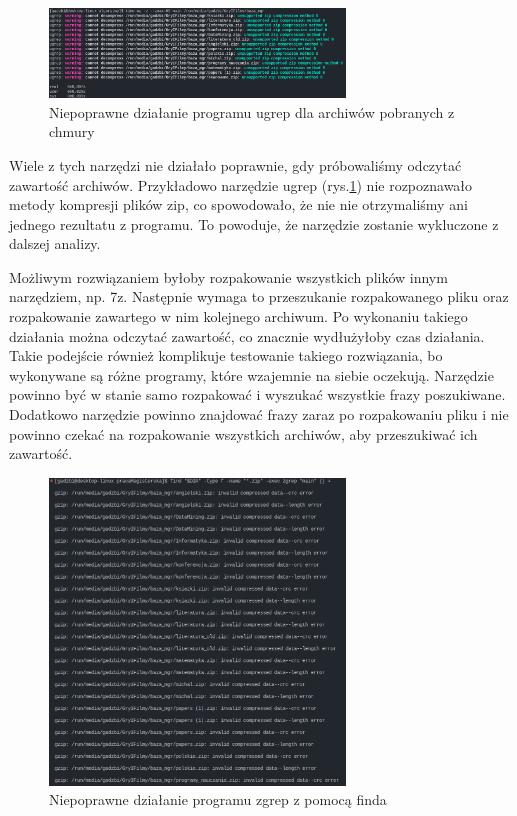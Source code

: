 \begin{figure}[h]
\centering
\includegraphics[width=0.7\textwidth]{./images/ugrep-errors.png}
\caption{Niepoprawne działanie programu ugrep dla archiwów pobranych z chmury}
\label{fig:ugrepErrors}
\end{figure}

Wiele z tych narzędzi nie działało poprawnie, gdy próbowaliśmy odczytać zawartość
archiwów. Przykładowo narzędzie ugrep (rys.\ref{fig:ugrepErrors}) nie rozpoznawało 
metody kompresji plików zip, co spowodowało, że nie nie otrzymaliśmy ani 
jednego rezultatu z programu. To powoduje, że narzędzie zostanie wykluczone z 
dalszej analizy.

Możliwym rozwiązaniem byłoby rozpakowanie wszystkich plików innym narzędziem, np.
7z. Następnie wymaga to przeszukanie rozpakowanego pliku oraz rozpakowanie 
zawartego w nim kolejnego archiwum. Po wykonaniu takiego działania można 
odczytać zawartość, co znacznie wydłużyłoby czas działania. Takie podejście również
komplikuje testowanie takiego rozwiązania, bo wykonywane są różne programy, 
które wzajemnie na siebie oczekują. Narzędzie powinno być w stanie samo 
rozpakować i wyszukać wszystkie frazy poszukiwane. Dodatkowo narzędzie powinno
znajdować frazy zaraz po rozpakowaniu pliku i nie powinno czekać na rozpakowanie
wszystkich archiwów, aby przeszukiwać ich zawartość.

\begin{figure}[h]
\centering
\includegraphics[width=0.7\textwidth]{./images/zgrep-errors.png}
\caption{Niepoprawne działanie programu zgrep z pomocą finda}
\label{fig:zgrepErrors}
\end{figure}

